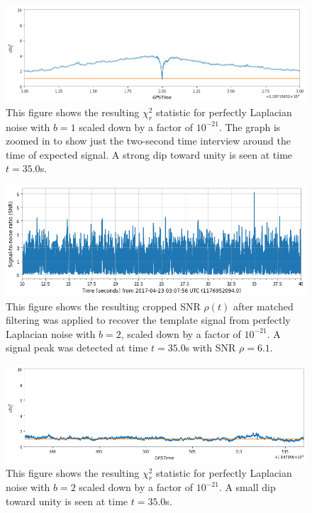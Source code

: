 \documentclass[preprint,
letterpaper,
 amsmath,amssymb,
 aps,
]{revtex4-2}
\begin{document}
\begin{widetext}

\begin{figure}[t]
\includegraphics[width = .9\textwidth]{chi2 laplace b=1.png}
\caption{This figure shows the resulting $\chi^2_r$ statistic for perfectly Laplacian noise with $b=1$ scaled down by a factor of $10^{-21}$. The graph is zoomed in to show just the two-second time interview around the time of expected signal. A strong dip toward unity is seen at time $t = 35.0$s.}
\centering
\end{figure} 


\begin{figure}[t]
\includegraphics[width = .9\textwidth]{laplacian b=2 template 1.png}
\caption{This figure shows the resulting cropped SNR $\rho(t)$ after matched filtering was applied to recover the template signal from perfectly Laplacian noise with $b=2$, scaled down by a factor of $10^{-21}$. A signal peak was detected at time $t = 35.0$s with SNR $\rho = 6.1$.}
\centering
\end{figure} 

\begin{figure}[t]
\includegraphics[width = .9\textwidth]{chi2 laplace b=2 zoomed.png}
\caption{This figure shows the resulting $\chi^2_r$ statistic for perfectly Laplacian noise with $b=2$ scaled down by a factor of $10^{-21}$. A small dip toward unity is seen at time $t = 35.0$s.}
\centering
\end{figure} 
\end{widetext}
\end{document}
